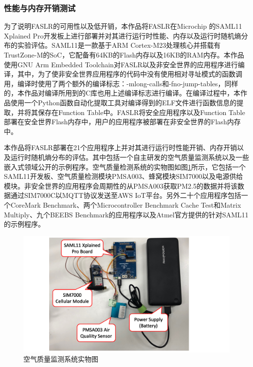 \documentclass[UTF8,12pt,a4paper,twoside]{ctexart}
\numberwithin{figure}{section}
\begin{document}
\subsubsection{性能与内存开销测试}
\par 为了说明FASLR的可用性以及低开销，本作品将FASLR在Microchip 的SAML11 Xplained Pro开发板上进行部署并对其进行运行时性能、内存以及运行时随机熵分布的实验评估。SAML11是一款基于ARM Cortex-M23处理核心并搭载有TrustZone-M的SoC，它配备有64KB的Flash内存以及16KB的RAM内存。本作品使用GNU Arm Embedded Toolchain对FASLR以及非安全世界的应用程序进行编译，其中，为了使非安全世界应用程序的代码中没有使用相对寻址模式的函数调用，编译时使用了两个额外的编译标志：-mlong-calls和-fno-jump-tables，同样的，本作品对编译所用到的C库也用上述编译标志进行编译。在编译过程中，本作品使用一个Python函数自动化提取工具对编译得到的ELF文件进行函数信息的提取，并将其保存在Function Table中。FASLR将安全应用程序以及Function Table部署在安全世界Flash内存中，用户的应用程序被部署在非安全世界的Flash内存中。
\par 本作品将FASLR部署在21个应用程序上并对其进行运行时性能开销、内存开销以及运行时随机熵分布的评估。其中包括一个自主研发的空气质量监测系统以及一些嵌入式领域公开的示例程序。空气质量检测系统的实物图如图\ref{physicalDrawing}所示，它包括一个SAML11开发板、空气质量检测模块PMSA003、蜂窝模块SIM7000以及电源供给模块。非安全世界的应用程序会周期性的从PMSA003获取PM2.5的数据并将该数据通过SIM7000C以MQTT协议发送至AWS IoT平台。另外二十个应用程序包括一个CoreMark Benchmark\cite{CoreMarkBenchmark}、两个Microcontroller Benchmark Cache Test和Matrix Multiply、九个BEEBS Benchmark\cite{BEEBSBenchmark}的应用程序以及Atmel官方\cite{Atmel}提供的针对SAML11的示例程序。
\begin{figure}[H] %
    \label{physicalDrawing}
    \centering
    \includegraphics[scale=0.8]{graph/physicalDrawing.png}
    \caption{空气质量监测系统实物图}
\end{figure}
\end{document}

